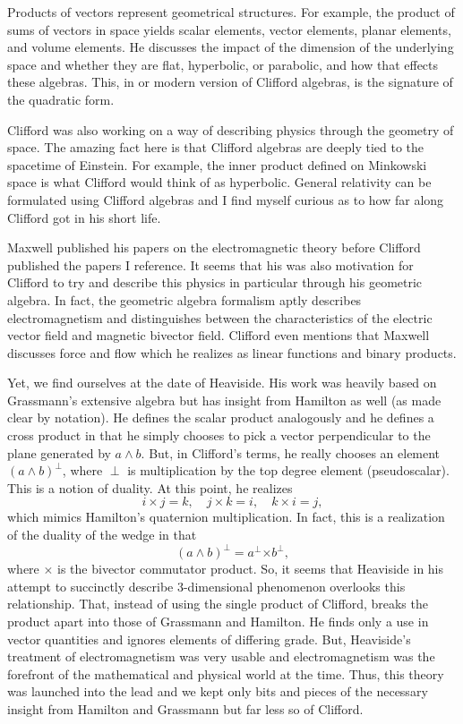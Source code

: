 \documentclass[12pt]{article}
\begin{document}
Products of vectors represent geometrical structures. For example, the product of sums of vectors in space yields scalar elements, vector elements, planar elements, and volume elements. He discusses the impact of the dimension of the underlying space and whether they are flat, hyperbolic, or parabolic, and how that effects these algebras. This, in or modern version of Clifford algebras, is the signature of the quadratic form. 

Clifford was also working on a way of describing physics through the geometry of space. The amazing fact here is that Clifford algebras are deeply tied to the spacetime of Einstein. For example, the inner product defined on Minkowski space is what Clifford would think of as hyperbolic. General relativity can be formulated using Clifford algebras and I find myself curious as to how far along Clifford got in his short life.

Maxwell published his papers on the electromagnetic theory before Clifford published the papers I reference. It seems that his was also motivation for Clifford to try and describe this physics in particular through his geometric algebra. In fact, the geometric algebra formalism aptly describes electromagnetism and distinguishes between the characteristics of the electric vector field and magnetic bivector field. Clifford even mentions that Maxwell discusses force and flow which he realizes as linear functions and binary products.

Yet, we find ourselves at the date of Heaviside. His work was heavily based on Grassmann's extensive algebra but has insight from Hamilton as well (as made clear by notation). He defines the scalar product analogously and he defines a cross product in that he simply chooses to pick a vector perpendicular to the plane generated by $a \wedge b$. But, in Clifford's terms, he really chooses an element $(a\wedge b)^\perp$, where $\perp$ is multiplication by the top degree element (pseudoscalar). This is a notion of duality. At this point, he realizes
\[
i\times j = k,\quad j \times k = i, \quad k\times i = j,
\]
which mimics Hamilton's quaternion multiplication. In fact, this is a realization of the duality of the wedge in that
\[
(a \wedge b)^\perp = a^\perp \boldsymbol{\times} b^\perp,
\]
where $\boldsymbol{\times}$ is the bivector commutator product. So, it seems that Heaviside in his attempt to succinctly describe 3-dimensional phenomenon overlooks this relationship. That, instead of using the single product of Clifford, breaks the product apart into those of Grassmann and Hamilton. He finds only a use in vector quantities and ignores elements of differing grade. But, Heaviside's treatment of electromagnetism was very usable and electromagnetism was the forefront of the mathematical and physical world at the time. Thus, this theory was launched into the lead and we kept only bits and pieces of the necessary insight from Hamilton and Grassmann but far less so of Clifford.
\end{document}
